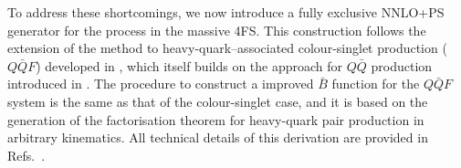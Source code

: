 \documentclass[11pt,a4paper]{article}
\DeclareMathOperator{\Tr}{Tr}
\begin{document}

To address these shortcomings, we now introduce a fully exclusive NNLO+PS generator for the \bbH{} process in the massive 4FS.  This construction follows the extension of the \minnlo{} method to heavy-quark–associated colour-singlet production (\(Q\bar{Q}F\)) developed in , which itself builds on the \minnlo{} approach for \(Q\bar{Q}\) production introduced in \cite{mazzitelli:2020jio,mazzitelli:2021mmm}. The procedure to construct a \minnlo{} improved \(\bar{B}\) function for the \(Q\bar{Q}F\) system is the same as that of the colour-singlet case, and it is based on the generation of the factorisation theorem for heavy-quark pair production \cite{Zhu:2012ts,Li:2013mia,Catani:2014qha,Catani:2018mei} in arbitrary kinematics.  All technical details of this derivation are provided in Refs.~\cite{mazzitelli:2020jio,mazzitelli:2021mmm,mazzitelli:2024ura,Biello:2024pgo}.
\end{document}
